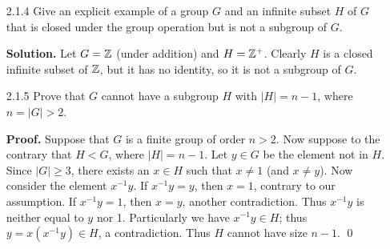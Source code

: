 \begin{enumerate}
       \qed
   \item[2.1.4]   Give an explicit example of a group $G$ and an infinite subset
                  $H$ of $G$ that is closed under the group operation but is not
                  a subgroup of $G$.

      \textbf{Solution.} Let $G = \mathbb{Z}$ (under addition) and $H = \mathbb{Z}^+$. Clearly
      $H$ is a closed infinite subset of $\mathbb{Z}$, but it has no identity, so it is 
      not a subgroup of $G$.
   \item[2.1.5]   Prove that $G$ cannot have a subgroup $H$ with $|H| = n - 1$,
                  where $n = |G| > 2$.

      \textbf{Proof.} Suppose that $G$ is a finite group of order $n > 2$. Now
      suppose to the contrary that $H < G$, where $|H| = n - 1$. Let $y \in G$
      be the element not in $H$. Since $|G| \ge 3$, there exists an
      $x \in H$ such that $x \neq 1$ (and $x \neq y$). Now consider the element
      $x^{-1}y$. If $x^{-1}y = y$, then $x = 1$, contrary to our assumption. If
      $x^{-1}y = 1$, then $x = y$, another contradiction. Thus $x^{-1}y$ is
      neither equal to $y$ nor 1. Particularly we have $x^{-1}y \in H$; thus
      $y = x(x^{-1}y) \in H$, a contradiction. Thus $H$ cannot have size
      $n - 1$. \qed


\end{enumerate}
